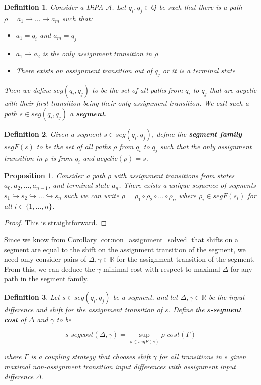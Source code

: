 \documentclass{article}
\newcommand{\R}{\mathbb{R}}
\newtheorem{proposition}{Proposition}[section]
\newtheorem{definition}{Definition}[section]
\newcommand{\1}{\langle 1 \rangle}
\newcommand{\2}{\langle 2 \rangle}
\begin{document}
\begin{definition}
    Consider a DiPA $\mathcal{A}$. Let $q_i, q_j \in Q$ be such that there is a path $\rho = a_1 \to \dots \to a_m$ such that:

    \begin{itemize}
        \item $a_1 = q_i$ and $a_m = q_j$
        \item $a_1 \to a_2$ is the only assignment transition in $\rho$
        \item There exists an assignment transition out of $q_j$ or it is a terminal state
    \end{itemize}

    Then we define $seg(q_i, q_j)$ to be the set of all paths from $q_i$ to $q_j$ that are acyclic with their first transition being their only assignment transition. We call such a path $s \in seg(q_i, q_j)$ a \textbf{segment}. 
\end{definition}

\begin{definition}
    Given a segment $s \in seg(q_i, q_j)$, define the \textbf{segment family} $segF(s)$ to be the set of all paths $\rho$ from $q_i$ to $q_j$ such that the only assignment transition in $\rho$ is from $q_i$ and $acyclic(\rho) = s$.
\end{definition}

\begin{proposition}
    \label{prop:segmenting}
    Consider a path $\rho$ with assignment transitions from states $a_0, a_2, \dots, a_{n - 1}$, and terminal state $a_n$. There exists a unique sequence of segments $s_1 \hookrightarrow s_2 \hookrightarrow \dots \hookrightarrow s_n$ such we can write $\rho = \rho_1 \circ \rho_2 \circ \dots \circ \rho_n$ where $\rho_i \in segF(s_i)$ for all $i \in \{1, \dots, n\}$.
\end{proposition} 

\begin{proof}
    This is straightforward.
\end{proof}

Since we know from Corollary \ref{cor:non_assignment_solved} that shifts on a segment are equal to the shift on the assignment transition of the segment, we need only consider pairs of $\Delta, \gamma \in \R$ for the assignment transition of the segment. From this, we can deduce the $\gamma$-minimal cost with respect to maximal $\Delta$ for any path in the segment family.

\begin{definition}
    Let $s \in seg(q_i, q_j)$ be a segment, and let $\Delta, \gamma \in \R$ be the input difference and shift for the assignment transition of $s$. Define the \textbf{$s$-segment cost} of $\Delta$ and $\gamma$ to be

    \[s\text{-}segcost(\Delta, \gamma) = \sup_{\rho \in segF(s)} \rho\text{-}cost(\Gamma) \]

    where $\Gamma$ is a coupling strategy that chooses shift $\gamma$ for all transitions in $s$ given maximal non-assignment transition input differences with assignment input difference $\Delta$.
\end{definition}
\end{document}
